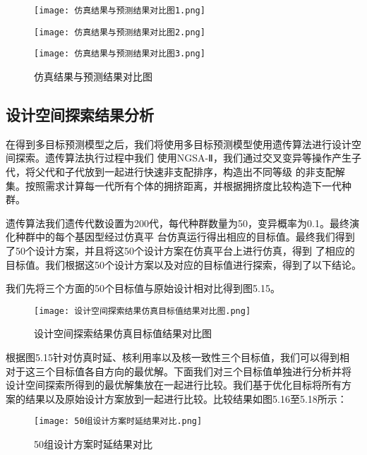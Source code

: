 \begin{figure}[!h]
    \centering
    \texttt{[image: 仿真结果与预测结果对比图1.png]}
\end{figure}

\begin{figure}[!h]
    \centering
    \texttt{[image: 仿真结果与预测结果对比图2.png]}
\end{figure}

\begin{figure}[!h]
    \centering
    \texttt{[image: 仿真结果与预测结果对比图3.png]}
    \caption{仿真结果与预测结果对比图}
\end{figure}

\subsection{设计空间探索结果分析}

在得到多目标预测模型之后，我们将使用多目标预测模型使用遗传算法进行设计空间探索。遗传算法执行过程中我们
使用NGSA-Ⅱ，我们通过交叉变异等操作产生子代，将父代和子代放到一起进行快速非支配排序，构造出不同等级
的非支配解集。按照需求计算每一代所有个体的拥挤距离，并根据拥挤度比较构造下一代种群。

遗传算法我们遗传代数设置为200代，每代种群数量为50，变异概率为0.1。最终演化种群中的每个基因型经过仿真平
台仿真运行得出相应的目标值。最终我们得到了50个设计方案，并且将这50个设计方案在仿真平台上进行仿真，得到
了相应的目标值。我们根据这50个设计方案以及对应的目标值进行探索，得到了以下结论。

我们先将三个方面的50个目标值与原始设计相对比得到图5.15。

\begin{figure}
    \centering
    \texttt{[image: 设计空间探索结果仿真目标值结果对比图.png]}
    \caption{设计空间探索结果仿真目标值结果对比图}
    \label{fig:badge}
\end{figure}

根据图5.15针对仿真时延、核利用率以及核一致性三个目标值，我们可以得到相
对于这三个目标值各自方向的最优解。下面我们对三个目标值单独进行分析并将
设计空间探索所得到的最优解集放在一起进行比较。我们基于优化目标将所有方
案的结果以及原始设计方案放到一起进行比较。比较结果如图5.16至5.18所示：

\begin{figure}[h]
    \centering
    \texttt{[image: 50组设计方案时延结果对比.png]}
    \caption{50组设计方案时延结果对比}
    \label{fig:badge}
\end{figure}

